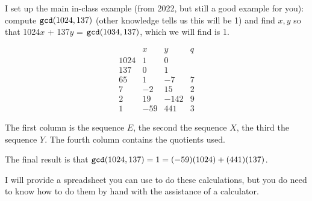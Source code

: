 \documentclass[12pt]{article}
\begin{document}
I set up the main in-class example (from 2022, but still a good example for you):  compute ${\tt gcd}(1024,137)$ (other knowledge tells us this will be 1) and find $x,y$ so that
1024$x$ + 137$y$ = ${\tt gcd}(1034,137)$, which we will find is 1.

$$\begin{array}{c|c|c|c}

&x & y& q \\

1024 & 1&0 &\\

 137 & 0 & 1 &\\

 65 & 1 & -7 & 7\\

7 &-2 & 15& 2 \\

 2 &19 & -142& 9 \\

 1 &-59 & 441 & 3
\end{array}$$

The first column is the sequence $E$, the second the sequence $X$, the third the sequence $Y$.  The fourth column contains the quotients used.

The final result is that ${\tt gcd}(1024,137)= 1 = (-59)(1024)+(441)(137)$.

I will provide a spreadsheet you can use to do these calculations, but you do need to know how to do them by hand with the assistance of a calculator.
\end{document}
